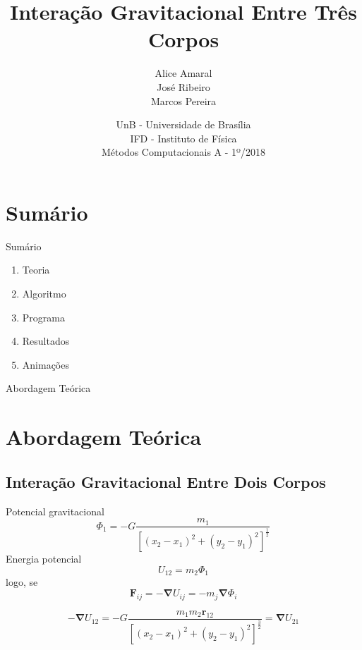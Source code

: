 \documentclass[compress]{beamer}
\title{Interação Gravitacional Entre Três Corpos}
\author{Alice Amaral\\ José Ribeiro\\ Marcos Pereira}
\date{UnB - Universidade de Brasília\\
IFD - Instituto de Física\\
Métodos Computacionais A - 1º/2018}
\institute{}
\begin{document}
\frame{\titlepage}

\section{Sumário}

\begin{frame}{Sumário}
\begin{enumerate}
\item<+->{Teoria}
\item<+->{Algoritmo}
\item<+->{Programa}
\item<+->{Resultados}
\item<+->{Animações}
\end{enumerate}
\end{frame}


\begin{frame}{Abordagem Teórica}
\section{Abordagem Teórica}
\subsection{Interação Gravitacional Entre Dois Corpos}
Potencial gravitacional
\begin{equation}
    \varPhi_{1}=-G\frac{m_{1}}{\left[\left(x_2-x_1\right)^2+\left(y_2-y_1\right)^2\right]^{\frac{1}{2}}}
\end{equation}
Energia potencial
\begin{equation}
U_{12}=m_{2}\varPhi_{1}    
\end{equation}
logo, se $$\mathbf{F}_{ij}=-\bm{\nabla}U_{ij}=-m_j\bm{\nabla}\varPhi_i$$
\begin{center}
\begin{displaymath}
-\bm{\nabla}U_{12}=-G\frac{m_1m_2\mathbf{r}_{12}}{\left[\left(x_2-x_1\right)^2+\left(y_2-y_1\right)^2\right]^{\frac{3}{2}}}=\bm{\nabla}U_{21}
\end{displaymath}

\end{center}

\end{frame}
\end{document}
